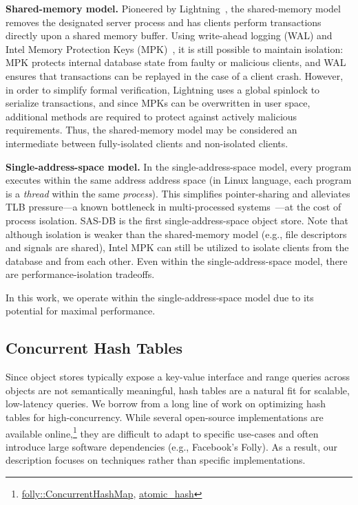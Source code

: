 \textbf{Shared-memory model.} Pioneered by Lightning~\cite{lightning22}, the
shared-memory model removes the designated server process and has clients
perform transactions directly upon a shared memory buffer. Using write-ahead
logging (WAL) and Intel Memory Protection Keys (MPK)~\cite{park19libmpk}, it is
still possible to maintain isolation: MPK protects internal database state from
faulty or malicious clients, and WAL ensures that transactions can be replayed
in the case of a client crash. However, in order to simplify formal
verification, Lightning uses a global spinlock to serialize transactions, and
since MPKs can be overwritten in user space, additional methods are required to
protect against actively malicious requirements. Thus, the shared-memory model
may be considered an intermediate between fully-isolated clients and
non-isolated clients.

\textbf{Single-address-space model.} In the single-address-space model, every
program executes within the same address address space (in Linux language, each
program is a \emph{thread} within the same \emph{process}). This simplifies
pointer-sharing and alleviates TLB pressure---a known bottleneck in
multi-processed systems~\cite{basu13bigmem, navarro02superpages}---at the cost of
process isolation. SAS-DB is the first single-address-space object store. Note
that although isolation is weaker than the shared-memory model (e.g., file
descriptors and signals are shared), Intel MPK can still be utilized to isolate
clients from the database and from each other. Even within the
single-address-space model, there are performance-isolation tradeoffs.

In this work, we operate within the single-address-space model due to its
potential for maximal performance.

\subsection{Concurrent Hash Tables}
\label{sec:hash-tables}
Since object stores typically expose a key-value interface and range queries
across objects are not semantically meaningful, hash tables are a natural fit
for scalable, low-latency queries. We borrow from a long line of work on
optimizing hash tables for high-concurrency. While several open-source
implementations are available
online,\footnote{\href{https://github.com/facebook/folly/blob/main/folly/concurrency/ConcurrentHashMap.h}{folly::ConcurrentHashMap},
	\href{https://github.com/divfor/atomic_hash}{atomic\_hash}} they are difficult
to adapt to specific use-cases and often introduce large software dependencies
(e.g., Facebook's Folly). As a result, our description focuses on techniques
rather than specific implementations.

